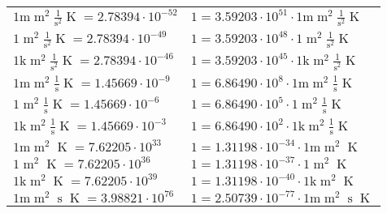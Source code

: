 \begin{center}
\begin{longtable}{l l}
{\color{gray}$1 \bm{\mathrm{ m}}{\operatorname{m}^2}\frac1{\operatorname{s}^2}{}{\operatorname{K}} = 2.78394\cdot10^{-52} $}   & {\color{gray}$ 1 = 3.59203\cdot10^{51} \cdot 1 \bm{\mathrm{ m}}{\operatorname{m}^2}\frac1{\operatorname{s}^2}{}{\operatorname{K}}$}  \\
{\color{black}$1 \bm{\mathrm{ }}{\operatorname{m}^2}\frac1{\operatorname{s}^2}{}{\operatorname{K}} = 2.78394\cdot10^{-49} $}   & {\color{black}$ 1 = 3.59203\cdot10^{48} \cdot 1 \bm{\mathrm{ }}{\operatorname{m}^2}\frac1{\operatorname{s}^2}{}{\operatorname{K}}$}  \\
{\color{gray}$1 \bm{\mathrm{ k}}{\operatorname{m}^2}\frac1{\operatorname{s}^2}{}{\operatorname{K}} = 2.78394\cdot10^{-46} $}   & {\color{gray}$ 1 = 3.59203\cdot10^{45} \cdot 1 \bm{\mathrm{ k}}{\operatorname{m}^2}\frac1{\operatorname{s}^2}{}{\operatorname{K}}$}  \\
{\color{gray}$1 \bm{\mathrm{ m}}{\operatorname{m}^2}\frac1{\operatorname{s}}{}{\operatorname{K}} = 1.45669\cdot10^{-9} $}   & {\color{gray}$ 1 = 6.86490\cdot10^{8} \cdot 1 \bm{\mathrm{ m}}{\operatorname{m}^2}\frac1{\operatorname{s}}{}{\operatorname{K}}$}  \\
{\color{black}$1 \bm{\mathrm{ }}{\operatorname{m}^2}\frac1{\operatorname{s}}{}{\operatorname{K}} = 1.45669\cdot10^{-6} $}   & {\color{black}$ 1 = 6.86490\cdot10^{5} \cdot 1 \bm{\mathrm{ }}{\operatorname{m}^2}\frac1{\operatorname{s}}{}{\operatorname{K}}$}  \\
{\color{gray}$1 \bm{\mathrm{ k}}{\operatorname{m}^2}\frac1{\operatorname{s}}{}{\operatorname{K}} = 1.45669\cdot10^{-3} $}   & {\color{gray}$ 1 = 6.86490\cdot10^{2} \cdot 1 \bm{\mathrm{ k}}{\operatorname{m}^2}\frac1{\operatorname{s}}{}{\operatorname{K}}$}  \\
{\color{gray}$1 \bm{\mathrm{ m}}{\operatorname{m}^2}{}{}{\operatorname{K}} = 7.62205\cdot10^{33} $}   & {\color{gray}$ 1 = 1.31198\cdot10^{-34} \cdot 1 \bm{\mathrm{ m}}{\operatorname{m}^2}{}{}{\operatorname{K}}$}  \\
{\color{black}$1 \bm{\mathrm{ }}{\operatorname{m}^2}{}{}{\operatorname{K}} = 7.62205\cdot10^{36} $}   & {\color{black}$ 1 = 1.31198\cdot10^{-37} \cdot 1 \bm{\mathrm{ }}{\operatorname{m}^2}{}{}{\operatorname{K}}$}  \\
{\color{gray}$1 \bm{\mathrm{ k}}{\operatorname{m}^2}{}{}{\operatorname{K}} = 7.62205\cdot10^{39} $}   & {\color{gray}$ 1 = 1.31198\cdot10^{-40} \cdot 1 \bm{\mathrm{ k}}{\operatorname{m}^2}{}{}{\operatorname{K}}$}  \\
{\color{gray}$1 \bm{\mathrm{ m}}{\operatorname{m}^2}{\operatorname{s}}{}{\operatorname{K}} = 3.98821\cdot10^{76} $}   & {\color{gray}$ 1 = 2.50739\cdot10^{-77} \cdot 1 \bm{\mathrm{ m}}{\operatorname{m}^2}{\operatorname{s}}{}{\operatorname{K}}$}  \\

\end{longtable}
\end{center}
